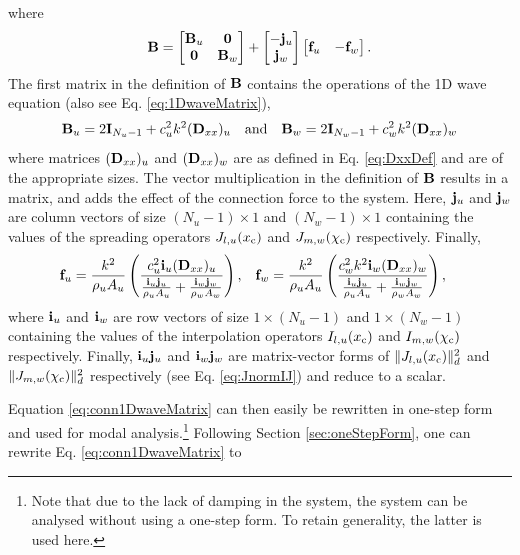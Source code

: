 where 
\begin{equation*}
    \mathbf{B} = \begin{bmatrix}
        \mathbf{B}_u & \mathbf{0}\\
        \mathbf{0} & \mathbf{B}_w 
    \end{bmatrix} + \begin{bmatrix}
        -\mathbf{j}_u\\
        \mathbf{j}_w
    \end{bmatrix}
    \begin{bmatrix}
        \mathbf{f}_u& -\mathbf{f}_w
    \end{bmatrix}.
\end{equation*}
The first matrix in the definition of $\mathbf{B}$ contains the operations of the 1D wave equation (also see Eq. \eqref{eq:1DwaveMatrix}),
\begin{equation}    
    \mathbf{B}_u = 2\mathbf{I}_{N_u-1} +c_u^2k^2 (\mathbf{D}_{xx})_u \quad \text{and} \quad \mathbf{B}_w = 2\mathbf{I}_{N_w-1} +c_w^2k^2 (\mathbf{D}_{xx})_w
\end{equation}
where matrices $(\mathbf{D}_{xx})_u$ and $(\mathbf{D}_{xx})_w$ are as defined in Eq. \eqref{eq:DxxDef} and are of the appropriate sizes. The vector multiplication in the definition of $\mathbf{B}$ results in a matrix, and adds the effect of the connection force to the system. Here, $\mathbf{j}_u$ and $\mathbf{j}_w$ are column vectors of size $(N_u-1)\times 1$ and $(N_w-1)\times 1$ containing the values of the spreading operators $J_{l, u}(x_{\text{c}})$ and $J_{m, w}(\chi_{\text{c}})$ respectively. Finally,
\begin{align*}
    \mathbf{f}_u = \frac{k^2}{\rho_uA_u} \left(\frac{c_u^2\mathbf{i}_u(\mathbf{D}_{xx})_u}{\frac{\mathbf{i}_u \mathbf{j}_u}{ \rho_u A_u} + \frac{\mathbf{i}_w \mathbf{j}_w}{\rho_w A_w}}\right),& \quad \mathbf{f}_w =  \frac{k^2}{\rho_uA_u}\left(\frac{c_w^2k^2 \mathbf{i}_w(\mathbf{D}_{xx})_w}{\frac{\mathbf{i}_u \mathbf{j}_u}{ \rho_u A_u} + \frac{\mathbf{i}_w \mathbf{j}_w}{\rho_w A_w}}\right),
\end{align*}
where $\mathbf{i}_u$ and $\mathbf{i}_w$ are row vectors of size $1\times (N_u-1)$ and $1\times (N_w-1)$ containing the values of the interpolation operators $I_{l, u}(x_{\text{c}})$ and $I_{m, w}(\chi_{\text{c}})$ respectively. Finally, $\mathbf{i}_u\mathbf{j}_u$ and $\mathbf{i}_w\mathbf{j}_w$ are matrix-vector forms of $\lVert J_{l, u}(x_{\text{c}})\rVert_d^2$ and $\lVert J_{m, w}(\chi_{\text{c}})\rVert_d^2$ respectively (see Eq. \eqref{eq:JnormIJ}) and reduce to a scalar. 

Equation \eqref{eq:conn1DwaveMatrix} can then easily be rewritten in one-step form and used for modal analysis.\footnote{Note that due to the lack of damping in the system, the system can be analysed without using a one-step form. To retain generality, the latter is used here.} Following Section \ref{sec:oneStepForm}, one can rewrite Eq. \eqref{eq:conn1DwaveMatrix} to

